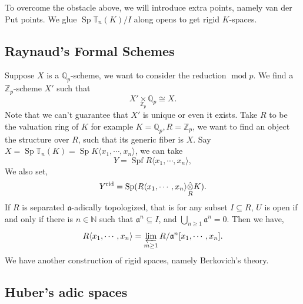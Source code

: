\documentclass[10pt]{article}
\numberwithin{equation}{section}
\DeclareMathOperator{\tmod}{mod}
\DeclareMathOperator{\Sp}{Sp}
\DeclareMathOperator{\rid}{rid}
\DeclareMathOperator{\Spf}{Spf}
\newcommand{\N}[0]{\mathbb{N}}
\newcommand{\Z}[0]{\mathbb{Z}}
\newcommand{\Q}[0]{\mathbb{Q}}
\newcommand{\T}[0]{\mathbb{T}}
\newcommand{\fib}[1]{%
  \mathbin{\mathop{\times}\limits_{#1}}%
}
\newcommand{\tens}[1]{%
  \mathbin{\mathop{\otimes}\displaylimits_{#1}}%
}
\begin{document}
To overcome the obstacle above, we will introduce extra points, namely van der Put points.
We glue $\Sp\T_n(K)/I$ along opens to get rigid $K$-spaces.


\subsection{Raynaud's Formal Schemes}

Suppose $X$ is a $\Q_p$-scheme, we want to consider the reduction $\tmod{p}$. We find a $\Z_p$-scheme $X'$ such that 
\begin{equation*}
  X'\fib{\Z_p}\Q_p\cong X.
\end{equation*}
Note that we can't guarantee that $X'$ is unique or even it exists. Take $R$ to be the valuation ring of $K$ for example $K=\Q_p,R=\Z_p$, we want to find an object the structure over $R$, such that its generic fiber is $X$.
Say $X=\Sp\T_n(K)=\Sp K\langle x_1,\cdots,x_n\rangle$, we can take 
\begin{equation*}
  Y = \Spf R\langle x_1,\cdots,x_n\rangle,
\end{equation*}
We also set,
\begin{equation*}
  Y^{\rid}=\Sp(R\langle x_1,\cdots,x_n\rangle\hat{\tens{R}}K).
\end{equation*}
If $R$ is separated $\mathfrak{a}$-adically topologized, that is for any subset $I\subseteq R$, $U$ is open if and only if there is $n\in\N$ such that $\mathfrak{a}^n\subseteq I$, and $\bigcup_{n\geq1}\mathfrak{a}^n=0$. 
Then we have,
\begin{equation*}
  R\langle x_1,\cdots,x_n\rangle = \varprojlim_{m\geq1}R/\mathfrak{a}^n[x_1,\cdots,x_n].
\end{equation*}
We have another construction of rigid spaces, namely Berkovich's theory.
\subsection{Huber's adic spaces}
\end{document}
